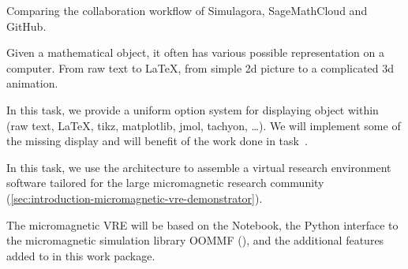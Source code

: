 \begin{workpackage}
\begin{tasklist}
\begin{task}[title=Visualization system for 3d data in web-notebook
, id=cfd-vis,lead=SR, partners={US,PS,USO}]
\end{task}


\begin{task}[id=mws,title=Math Search Engine,lead=JU,PM=10]
\end{task}

\begin{task}[id=simulagora,title=Simulagora collaboration,lead=LL,PM=2]
  Comparing the collaboration workflow of Simulagora, SageMathCloud and GitHub.
\end{task}

\begin{task}[lead=UB,title=Common option system for various displays in Sage,id=Sage-display,PM=12,partners={UB}]
  Given a mathematical object, it often has various possible representation on a
  computer. From raw text to \LaTeX, from simple 2d picture to
  a complicated 3d animation.

  In this task, we provide a uniform option system for displaying object within \Sage (raw text, \LaTeX,
  tikz, matplotlib, jmol, tachyon, \ldots). We will implement some of the missing display and will benefit
  of the work done in task~.
\end{task}

\begin{task}[lead=USO,title=Case study: micromagnetic VRE built from
  \TheProject,id=oommf-py-ipython-attributes,PM=6,partners={SR,USH}]

  In this task, we use the \TheProject architecture to assemble a
  virtual research environment software tailored for the large
  micromagnetic research community
  (\ref{sec:introduction-micromagnetic-vre-demonstrator}).

  The micromagnetic VRE will be based on the \Jupyter Notebook, the
  Python interface to the micromagnetic simulation library OOMMF
  (),
  and the additional features added to \Jupyter in this work
  package. 


\end{task}
\end{tasklist}
\end{workpackage}
